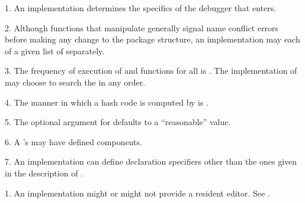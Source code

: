 \beginlist
\item{1.}
An implementation determines the specifics of the
debugger that  enters.

\item{2.} Although functions that manipulate 
generally signal
name conflict errors before making any change to the package structure, an
implementation may  
each of a given list of  separately.


\item{3.} 
 The frequency of execution of  and 
 functions for all  is . 
 The implementation of  may choose to search the  
 in any order.

\item{4.} The manner in which a 
hash code is computed by 
is . 

\item{5.} The optional argument 
for 
defaults to a ``reasonable'' 
value.

\item{6.} A 's  may have defined components.

\item{7.}
An implementation can define declaration specifiers other than the ones
given in the description of .

\endlist
\endsubSection%


\beginlist
\item{1.} An implementation might or might not provide a resident editor.
See .


